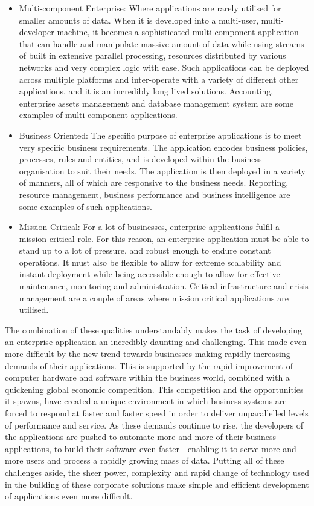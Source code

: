 \begin{itemize}
\item 	Multi-component Enterprise:  Where applications are rarely utilised for smaller amounts of data. When it is developed into a multi-user, multi-developer machine, it becomes a sophisticated multi-component application that can handle and manipulate massive amount of data while using streams of built in extensive parallel processing, resources distributed by various networks and very complex logic with ease. Such applications can be deployed across multiple platforms and inter-operate with a variety of different other applications, and it is an incredibly long lived solutions. Accounting, enterprise assets management and database management system are some examples of multi-component applications.

\item	Business Oriented: The specific purpose of enterprise applications is to meet very specific business requirements. The application encodes business policies, processes, rules and entities, and is developed within the business organisation to suit their needs. The application is then deployed in a variety of manners, all of which are responsive to the business needs. Reporting, resource management, business performance and business intelligence are some examples of such applications.

\item	Mission Critical: For a lot of businesses, enterprise applications fulfil a mission critical role. For this reason, an enterprise application must be able to stand up to a lot of pressure, and robust enough to endure constant operations. It must also be flexible to allow for extreme scalability and instant deployment while being accessible enough to allow for effective maintenance, monitoring and administration. Critical infrastructure and crisis management are a couple of areas where mission critical applications are utilised.

\end{itemize}

The combination of these qualities understandably makes the task of developing an enterprise application an incredibly daunting and challenging. This made even more difficult by the new trend towards businesses making rapidly increasing demands of their applications. This is supported by the rapid improvement of computer hardware and software within the business world, combined with a quickening global economic competition. This competition and the opportunities it spawns, have created a unique environment in which business systems are forced to respond at faster and faster speed in order to deliver unparallelled levels of performance and service. As these demands continue to rise, the developers of the applications are pushed to automate more and more of their business applications, to build their software even faster - enabling it to serve more and more users and process a rapidly growing mass of data. Putting all of these challenges aside, the sheer power, complexity and rapid change of technology used in the building of these corporate solutions make simple and efficient development of applications even more difficult.

